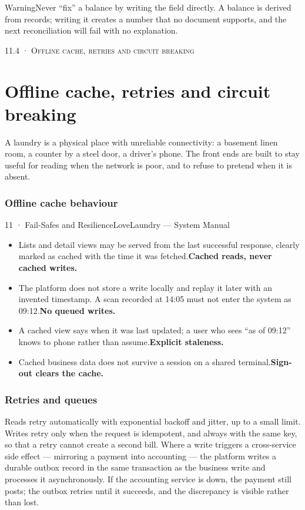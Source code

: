 \documentclass[11pt,a4paper,oneside]{book}
\begin{document}
\begin{notebox}WarningNever “fix” a balance by writing the field directly. A balance is derived from records; writing it creates a number that no document supports, and the next reconciliation will fail with no explanation.\end{notebox}
\textsc{\small\color{crimson}11.4 · Offline cache, retries and circuit breaking}\par\medskip
\section*{Offline cache, retries and circuit breaking}
A laundry is a physical place with unreliable connectivity: a basement linen room, a counter by a steel door, a driver's phone. The front ends are built to stay useful for reading when the network is poor, and to refuse to pretend when it is absent.

\subsubsection*{Offline cache behaviour}
11 · Fail-Safes and ResilienceLoveLaundry — System Manual

\begin{itemize}
\item Lists and detail views may be served from the last successful response, clearly marked as cached with the time it was fetched.\textbf{Cached reads, never cached writes.}
\item The platform does not store a write locally and replay it later with an invented timestamp. A scan recorded at 14:05 must not enter the system as 09:12.\textbf{No queued writes.}
\item A cached view says when it was last updated; a user who sees “as of 09:12” knows to phone rather than assume.\textbf{Explicit staleness.}
\item Cached business data does not survive a session on a shared terminal.\textbf{Sign-out clears the cache.}
\end{itemize}
\subsubsection*{Retries and queues}
Reads retry automatically with exponential backoff and jitter, up to a small limit. Writes retry only when the request is idempotent, and always with the same key, so that a retry cannot create a second bill. Where a write triggers a cross-service side effect — mirroring a payment into accounting — the platform writes a durable outbox record in the same transaction as the business write and processes it asynchronously. If the accounting service is down, the payment still posts; the outbox retries until it succeeds, and the discrepancy is visible rather than lost.
\end{document}
